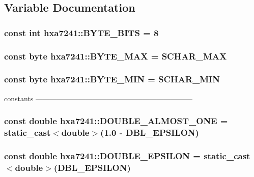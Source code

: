 \subsection{Variable Documentation}
\subsubsection{\setlength{\rightskip}{0pt plus 5cm}const int {\bf hxa7241::BYTE\_\-BITS} = 8}\label{namespacehxa7241_c802cdb38c9d21ee955d63d4ec4fd99c}


\subsubsection{\setlength{\rightskip}{0pt plus 5cm}const {\bf byte} {\bf hxa7241::BYTE\_\-MAX} = SCHAR\_\-MAX}\label{namespacehxa7241_f59c9ac5ab7a08e8a401541c5f92500d}


\subsubsection{\setlength{\rightskip}{0pt plus 5cm}const {\bf byte} {\bf hxa7241::BYTE\_\-MIN} = SCHAR\_\-MIN}\label{namespacehxa7241_611bdcb31914ce386ba010c3bae70ca2}


constants ------------------------------------------------------------------ 

\subsubsection{\setlength{\rightskip}{0pt plus 5cm}const double {\bf hxa7241::DOUBLE\_\-ALMOST\_\-ONE} = static\_\-cast$<$double$>$(1.0 - DBL\_\-EPSILON)}\label{namespacehxa7241_dc69c21791f41d1dec6484feba84e78b}


\subsubsection{\setlength{\rightskip}{0pt plus 5cm}const double {\bf hxa7241::DOUBLE\_\-EPSILON} = static\_\-cast$<$double$>$(DBL\_\-EPSILON)}\label{namespacehxa7241_4ca720e502303c8ff466000e00779167}


